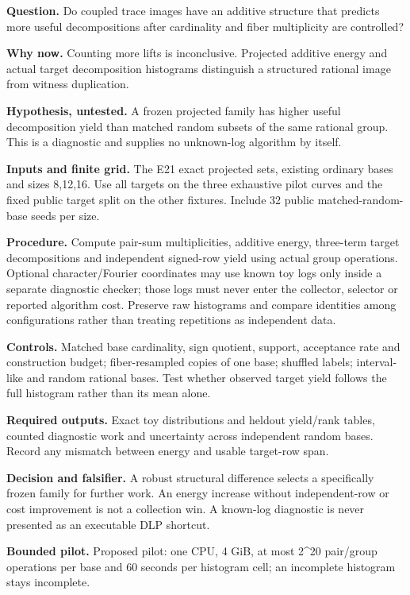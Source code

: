 \documentclass[
  10pt,
]{article}
\begin{document}
\textbf{Question.} Do coupled trace images have an additive structure
that predicts more useful decompositions after cardinality and fiber
multiplicity are controlled?

\textbf{Why now.} Counting more lifts is inconclusive. Projected
additive energy and actual target decomposition histograms distinguish a
structured rational image from witness duplication.

\textbf{Hypothesis, untested.} A frozen projected family has higher
useful decomposition yield than matched random subsets of the same
rational group. This is a diagnostic and supplies no unknown-log
algorithm by itself.

\textbf{Inputs and finite grid.} The E21 exact projected sets, existing
ordinary bases and sizes 8,12,16. Use all targets on the three
exhaustive pilot curves and the fixed public target split on the other
fixtures. Include 32 public matched-random-base seeds per size.

\textbf{Procedure.} Compute pair-sum multiplicities, additive energy,
three-term target decompositions and independent signed-row yield using
actual group operations. Optional character/Fourier coordinates may use
known toy logs only inside a separate diagnostic checker; those logs
must never enter the collector, selector or reported algorithm cost.
Preserve raw histograms and compare identities among configurations
rather than treating repetitions as independent data.

\textbf{Controls.} Matched base cardinality, sign quotient, support,
acceptance rate and construction budget; fiber-resampled copies of one
base; shuffled labels; interval-like and random rational bases. Test
whether observed target yield follows the full histogram rather than its
mean alone.

\textbf{Required outputs.} Exact toy distributions and heldout
yield/rank tables, counted diagnostic work and uncertainty across
independent random bases. Record any mismatch between energy and usable
target-row span.

\textbf{Decision and falsifier.} A robust structural difference selects
a specifically frozen family for further work. An energy increase
without independent-row or cost improvement is not a collection win. A
known-log diagnostic is never presented as an executable DLP shortcut.

\textbf{Bounded pilot.} Proposed pilot: one CPU, 4 GiB, at most 2\^{}20
pair/group operations per base and 60 seconds per histogram cell; an
incomplete histogram stays incomplete.
\end{document}
